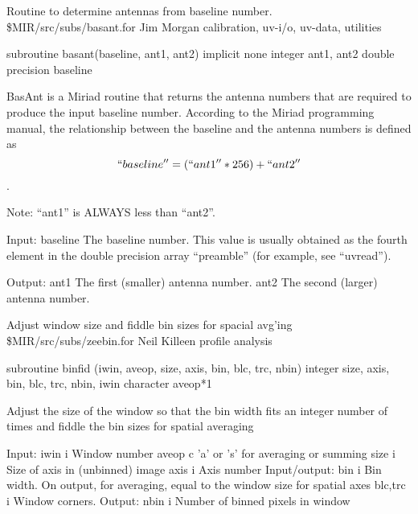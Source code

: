 %
\noindent Routine to determine antennas from baseline number.
\newline \ 
\newline {} \$MIR/src/subs/basant.for
\newline {} Jim Morgan
\newline {} calibration, uv-i/o, uv-data, utilities
\par{\tenpoint
{\eightpoint\begintt
      subroutine basant(baseline, ant1, ant2)
      implicit none
      integer ant1, ant2
      double precision baseline

  BasAnt is a Miriad routine that returns the antenna numbers that are
  required to produce the input baseline number.  According to the
  Miriad programming manual, the relationship between the baseline
  and the antenna numbers is defined as
           $$``baseline'' = (``ant1'' * 256) + ``ant2''$$.

  Note:   ``ant1'' is ALWAYS less than ``ant2''.

  Input:
    baseline The baseline number.  This value is usually obtained
             as the fourth element in the double precision array
             ``preamble'' (for example, see ``uvread'').

  Output:
    ant1     The first (smaller) antenna number.
    ant2     The second (larger) antenna number.
\endtt}
\par}
%
\noindent Adjust window size and fiddle bin sizes for spacial avg'ing
\newline \ 
\newline \abox{File:} \$MIR/src/subs/zeebin.for
\newline {} Neil Killeen
\newline \abox{Keywords:} profile analysis
\par{\tenpoint
{\eightpoint\begintt
      subroutine binfid (iwin, aveop, size, axis, bin, blc, trc, nbin)
      integer size, axis, bin, blc, trc, nbin, iwin
      character aveop*1

 Adjust the size of the window so that the bin width fits
 an integer number of times and fiddle the bin sizes for
 spatial averaging

     Input:
        iwin     i    Window number
        aveop    c   'a' or 's' for averaging or summing
        size     i    Size of axis in (unbinned) image
        axis     i    Axis number 
     Input/output:
        bin      i    Bin width.  On output, for averaging, equal to
                      the window size for spatial axes
        blc,trc  i    Window corners.
     Output:
        nbin     i    Number of binned pixels in window
\endtt}
\par}

